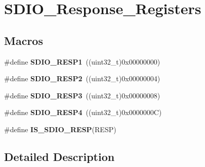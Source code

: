 \hypertarget{group___s_d_i_o___response___registers}{\section{S\-D\-I\-O\-\_\-\-Response\-\_\-\-Registers}
\label{group___s_d_i_o___response___registers}
}
\subsection*{Macros}
\begin{DoxyCompactItemize}
\item 
\hypertarget{group___s_d_i_o___response___registers_ga9d78943952cf0e36736313d949520a2d}{\#define {\bfseries S\-D\-I\-O\-\_\-\-R\-E\-S\-P1}~((uint32\-\_\-t)0x00000000)}\label{group___s_d_i_o___response___registers_ga9d78943952cf0e36736313d949520a2d}

\item 
\hypertarget{group___s_d_i_o___response___registers_gabd551272af4161844b5358fd3c3c379c}{\#define {\bfseries S\-D\-I\-O\-\_\-\-R\-E\-S\-P2}~((uint32\-\_\-t)0x00000004)}\label{group___s_d_i_o___response___registers_gabd551272af4161844b5358fd3c3c379c}

\item 
\hypertarget{group___s_d_i_o___response___registers_gae9887669a72395d54d600829a959d2f4}{\#define {\bfseries S\-D\-I\-O\-\_\-\-R\-E\-S\-P3}~((uint32\-\_\-t)0x00000008)}\label{group___s_d_i_o___response___registers_gae9887669a72395d54d600829a959d2f4}

\item 
\hypertarget{group___s_d_i_o___response___registers_ga57c3f6414198e5497736e398c02a1d9e}{\#define {\bfseries S\-D\-I\-O\-\_\-\-R\-E\-S\-P4}~((uint32\-\_\-t)0x0000000\-C)}\label{group___s_d_i_o___response___registers_ga57c3f6414198e5497736e398c02a1d9e}

\item 
\#define {\bfseries I\-S\-\_\-\-S\-D\-I\-O\-\_\-\-R\-E\-S\-P}(R\-E\-S\-P)
\end{DoxyCompactItemize}


\subsection{Detailed Description}


